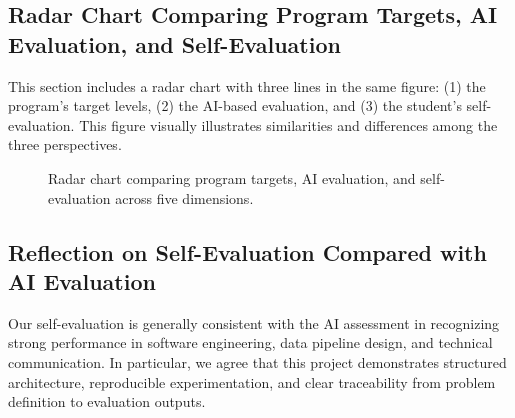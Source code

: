 \subsection{Radar Chart Comparing Program Targets, AI Evaluation, and Self-Evaluation}
\label{subsec:radar-self}

This section includes a radar chart with three lines in the same figure: (1) the program's target
levels, (2) the AI-based evaluation, and (3) the student's self-evaluation. This figure visually
illustrates similarities and differences among the three perspectives.

\begin{figure}[h!]
\centering
{}
\caption{Radar chart comparing program targets, AI evaluation, and self-evaluation across five dimensions.}
\label{fig:radar-self}
\end{figure}
\FloatBarrier

\subsection{Reflection on Self-Evaluation Compared with AI Evaluation}
\label{subsec:reflection-self}

Our self-evaluation is generally consistent with the AI assessment in recognizing strong
performance in software engineering, data pipeline design, and technical communication.
In particular, we agree that this project demonstrates structured architecture, reproducible
experimentation, and clear traceability from problem definition to evaluation outputs.

